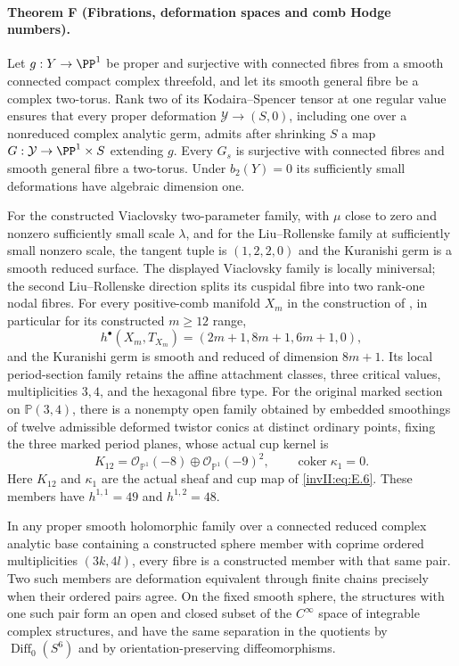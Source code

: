 \hypertarget{main-II-F}{}
\paragraph{Theorem F (Fibrations, deformation spaces and comb Hodge numbers).}
\label{series:II:F}
Let $g:Y\to\PP^1$ be proper and surjective with connected fibres
from a smooth connected compact complex threefold, and let its
smooth general fibre be a complex two-torus. Rank two of its
Kodaira--Spencer tensor at one regular value ensures that every
proper deformation $\mathcal Y\to(S,0)$, including one over a
nonreduced complex analytic germ, admits after shrinking $S$ a
map $G:\mathcal Y\to\PP^1\times S$ extending $g$. Every $G_s$
is surjective with connected fibres and smooth general fibre a
two-torus. Under $b_2(Y)=0$ its sufficiently small deformations
have algebraic dimension one.

For the constructed Viaclovsky two-parameter family, with
$\mu$ close to zero and nonzero sufficiently small scale
$\lambda$, and for the Liu--Rollenske family at sufficiently
small nonzero scale, the tangent tuple is $(1,2,2,0)$ and the
Kuranishi germ is a smooth reduced surface. The displayed
Viaclovsky family is locally miniversal; the second
Liu--Rollenske direction splits its cuspidal fibre into two
rank-one nodal fibres. For every positive-comb manifold $X_m$
in the construction of \cite{Viaclovsky2026Combs}, in particular
for its constructed $m\ge12$ range,
\[
 h^\bullet(X_m,T_{X_m})=(2m+1,8m+1,6m+1,0),
\]
and the Kuranishi germ is smooth and reduced of dimension $8m+1$.
Its local period-section family retains the affine attachment
classes, three critical values, multiplicities $3,4$, and the
hexagonal fibre type.
For the original marked section on $\mathbb P(3,4)$, there is a
nonempty open family obtained by embedded smoothings of twelve
admissible deformed twistor conics at distinct ordinary points,
fixing the three marked period planes, whose actual cup kernel is
\[
 K_{12}=\mathcal O_{\mathbb P^1}(-8)
       \oplus\mathcal O_{\mathbb P^1}(-9)^2,
 \qquad \operatorname{coker}\kappa_1=0.
\]
Here $K_{12}$ and $\kappa_1$ are the actual sheaf and cup map of
\eqref{invII:eq:E.6}. These members have
$h^{1,1}=49$ and $h^{1,2}=48$.

In any proper smooth holomorphic family over a connected reduced
complex analytic base containing a constructed sphere member with
coprime ordered multiplicities $(3k,4l)$, every fibre is a
constructed member with that same pair. Two such members are
deformation equivalent through finite chains precisely when their
ordered pairs agree. On the fixed smooth sphere, the structures
with one such pair form an open and closed subset of the
$C^\infty$ space of integrable complex structures, and have the
same separation in the quotients by $\operatorname{Diff}_0(S^6)$
and by orientation-preserving diffeomorphisms.

